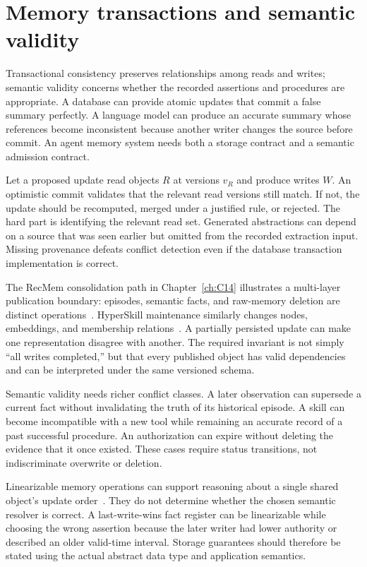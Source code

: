 \section{Memory transactions and semantic validity}\label{sec:C17:transactions}
Transactional consistency preserves relationships among reads and writes; semantic validity concerns whether the recorded assertions and procedures are appropriate. A database can provide atomic updates that commit a false summary perfectly. A language model can produce an accurate summary whose references become inconsistent because another writer changes the source before commit. An agent memory system needs both a storage contract and a semantic admission contract.

Let a proposed update read objects $R$ at versions $v_R$ and produce writes $W$. An optimistic commit validates that the relevant read versions still match. If not, the update should be recomputed, merged under a justified rule, or rejected. The hard part is identifying the relevant read set. Generated abstractions can depend on a source that was seen earlier but omitted from the recorded extraction input. Missing provenance defeats conflict detection even if the database transaction implementation is correct.

The RecMem consolidation path in Chapter~\ref{ch:C14} illustrates a multi-layer publication boundary: episodes, semantic facts, and raw-memory deletion are distinct operations~\cite{repo_recmem2026}. HyperSkill maintenance similarly changes nodes, embeddings, and membership relations~\cite{repo_hyperskill2026}. A partially persisted update can make one representation disagree with another. The required invariant is not simply ``all writes completed,'' but that every published object has valid dependencies and can be interpreted under the same versioned schema.

Semantic validity needs richer conflict classes. A later observation can supersede a current fact without invalidating the truth of its historical episode. A skill can become incompatible with a new tool while remaining an accurate record of a past successful procedure. An authorization can expire without deleting the evidence that it once existed. These cases require status transitions, not indiscriminate overwrite or deletion.

Linearizable memory operations can support reasoning about a single shared object's update order~\cite{herlihy1990linearizability}. They do not determine whether the chosen semantic resolver is correct. A last-write-wins fact register can be linearizable while choosing the wrong assertion because the later writer had lower authority or described an older valid-time interval. Storage guarantees should therefore be stated using the actual abstract data type and application semantics.

